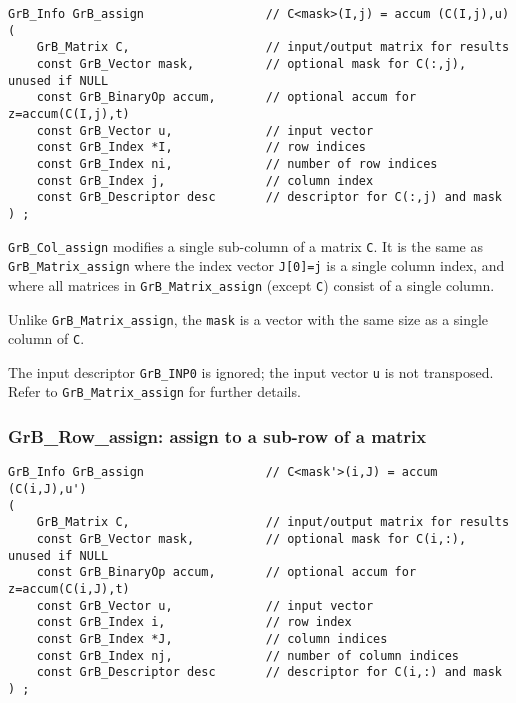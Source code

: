 \documentclass[12pt]{article}
\begin{document}
\begin{mdframed}[userdefinedwidth=6in]
{\footnotesize
\begin{verbatim}
GrB_Info GrB_assign                 // C<mask>(I,j) = accum (C(I,j),u)
(
    GrB_Matrix C,                   // input/output matrix for results
    const GrB_Vector mask,          // optional mask for C(:,j), unused if NULL
    const GrB_BinaryOp accum,       // optional accum for z=accum(C(I,j),t)
    const GrB_Vector u,             // input vector
    const GrB_Index *I,             // row indices
    const GrB_Index ni,             // number of row indices
    const GrB_Index j,              // column index
    const GrB_Descriptor desc       // descriptor for C(:,j) and mask
) ;
\end{verbatim} } \end{mdframed}

\verb'GrB_Col_assign' modifies a single sub-column of a matrix \verb'C'.  It is
the same as \verb'GrB_Matrix_assign' where the index vector \verb'J[0]=j' is a
single column index, and where all matrices in \verb'GrB_Matrix_assign' (except
\verb'C') consist of a single column.

Unlike \verb'GrB_Matrix_assign', the \verb'mask' is a vector with the same size
as a single column of \verb'C'.

The input descriptor \verb'GrB_INP0' is ignored; the input vector \verb'u' is
not transposed.  Refer to \verb'GrB_Matrix_assign' for further details.

\subsubsection{{\sf GrB\_Row\_assign:} assign to a sub-row of a matrix}
\label{assign_row}

\begin{mdframed}[userdefinedwidth=6in]
{\footnotesize
\begin{verbatim}
GrB_Info GrB_assign                 // C<mask'>(i,J) = accum (C(i,J),u')
(
    GrB_Matrix C,                   // input/output matrix for results
    const GrB_Vector mask,          // optional mask for C(i,:), unused if NULL
    const GrB_BinaryOp accum,       // optional accum for z=accum(C(i,J),t)
    const GrB_Vector u,             // input vector
    const GrB_Index i,              // row index
    const GrB_Index *J,             // column indices
    const GrB_Index nj,             // number of column indices
    const GrB_Descriptor desc       // descriptor for C(i,:) and mask
) ;
\end{verbatim} } \end{mdframed}
\end{document}
